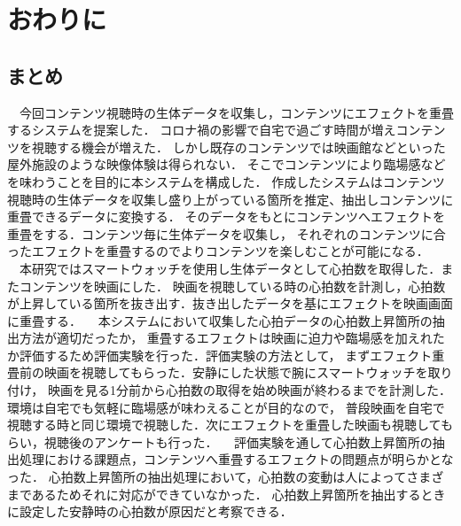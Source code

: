 \chapter{おわりに}

\section{まとめ}
　今回コンテンツ視聴時の生体データを収集し，コンテンツにエフェクトを重畳するシステムを提案した．
コロナ禍の影響で自宅で過ごす時間が増えコンテンツを視聴する機会が増えた．
しかし既存のコンテンツでは映画館などといった屋外施設のような映像体験は得られない．
そこでコンテンツにより臨場感などを味わうことを目的に本システムを構成した．
作成したシステムはコンテンツ視聴時の生体データを収集し盛り上がっている箇所を推定、抽出しコンテンツに重畳できるデータに変換する．
そのデータをもとにコンテンツへエフェクトを重畳をする．コンテンツ毎に生体データを収集し，
それぞれのコンテンツに合ったエフェクトを重畳するのでよりコンテンツを楽しむことが可能になる．
　本研究ではスマートウォッチを使用し生体データとして心拍数を取得した．またコンテンツを映画にした．
映画を視聴している時の心拍数を計測し，心拍数が上昇している箇所を抜き出す．抜き出したデータを基にエフェクトを映画画面に重畳する．
　本システムにおいて収集した心拍データの心拍数上昇箇所の抽出方法が適切だったか，
重畳するエフェクトは映画に迫力や臨場感を加えれたか評価するため評価実験を行った．評価実験の方法として，
まずエフェクト重畳前の映画を視聴してもらった．安静にした状態で腕にスマートウォッチを取り付け，
映画を見る1分前から心拍数の取得を始め映画が終わるまでを計測した．環境は自宅でも気軽に臨場感が味わえることが目的なので，
普段映画を自宅で視聴する時と同じ環境で視聴した．次にエフェクトを重畳した映画も視聴してもらい，視聴後のアンケートも行った．
　評価実験を通して心拍数上昇箇所の抽出処理における課題点，コンテンツへ重畳するエフェクトの問題点が明らかとなった．
心拍数上昇箇所の抽出処理において，心拍数の変動は人によってさまざまであるためそれに対応ができていなかった．
心拍数上昇箇所を抽出するときに設定した安静時の心拍数が原因だと考察できる．

